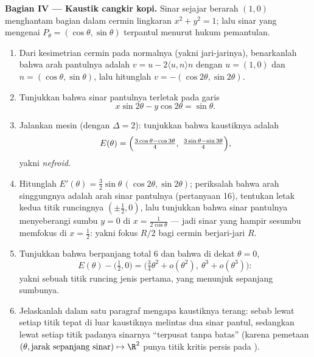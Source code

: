 \begin{problem}
\medskip
\noindent\textbf{Bagian IV --- Kaustik cangkir kopi.} Sinar
sejajar berarah $(1, 0)$ menghantam bagian dalam cermin
lingkaran $x^2 + y^2 = 1$; lalu sinar yang mengenai $P_\theta =
(\cos\theta, \sin\theta)$ terpantul menurut hukum
pemantulan.
\begin{enumerate}[resume]
  \item Dari kesimetrian cermin pada normalnya (yakni jari-jarinya),
        benarkanlah bahwa arah pantulnya adalah $v = u -
        2\langle u, n\rangle n$ dengan $u = (1,0)$ dan $n =
        (\cos\theta, \sin\theta)$, lalu hitunglah $v =
        -(\cos2\theta, \sin2\theta)$.
  \item Tunjukkan bahwa sinar pantulnya terletak pada garis
        \[
        x\sin 2\theta - y\cos 2\theta = \sin\theta .
        \]
  \item Jalankan mesin  (dengan $\Delta = 2$): tunjukkan bahwa
        kaustiknya adalah
        \[
        E(\theta) = \Bigl(\tfrac{3\cos\theta -
        \cos3\theta}4,\ \tfrac{3\sin\theta -
        \sin3\theta}4\Bigr),
        \]
        yakni \emph{nefroid}.
  \item Hitunglah $E'(\theta) = \tfrac32\sin\theta\,
        (\cos2\theta, \sin2\theta)$; periksalah bahwa arah
        singgungnya adalah arah sinar pantulnya (pertanyaan
        16), tentukan letak kedua titik runcingnya $(\pm\tfrac12, 0)$, lalu
        tunjukkan bahwa sinar pantulnya menyeberangi sumbu $y = 0$
        di $x = \frac1{2\cos\theta}$ --- jadi sinar yang hampir sesumbu
        memfokus di $x = \tfrac12$: yakni  fokus $R/2$ bagi
        cermin berjari-jari $R$.
  \item Tunjukkan bahwa  berpanjang total $6$ dan bahwa
        di dekat $\theta = 0$,
        \[
        E(\theta) - \bigl(\tfrac12, 0\bigr) =
        \bigl(\tfrac34\theta^2 + o(\theta^2),\ \theta^3 +
        o(\theta^3)\bigr) :
        \]
        yakni sebuah titik runcing jenis pertama, yang menunjuk sepanjang sumbunya.
  \item Jelaskanlah dalam satu paragraf mengapa kaustiknya terang:
        sebab lewat setiap titik tepat di luar kaustiknya melintas dua
        sinar pantul, sedangkan lewat setiap titik padanya sinarnya
        ``terpusat tanpa batas'' (karena pemetaan $(\theta,
        \text{jarak sepanjang sinar}) \mapsto \R^2$ punya
        titik kritis persis pada ).
\end{enumerate}


\end{problem}
